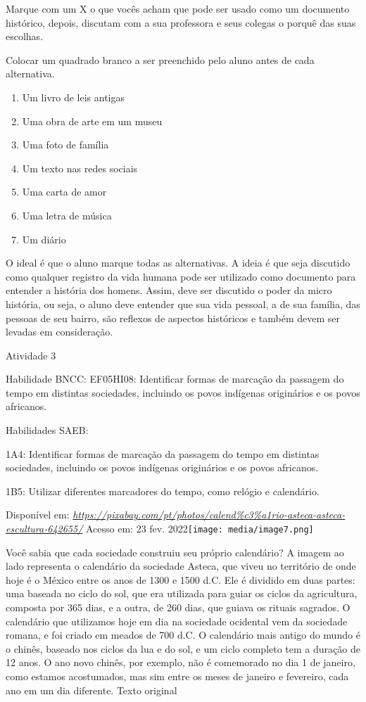 Marque com um X o que vocês acham que pode ser usado como um documento
histórico, depois, discutam com a sua professora e seus colegas o porquê
das suas escolhas.

Colocar um quadrado branco a ser preenchido pelo aluno antes de cada
alternativa.

\begin{enumerate}
\def\labelenumi{\arabic{enumi}.}
\item
  Um livro de leis antigas
\item
  Uma obra de arte em um museu
\item
  Uma foto de família
\item
  Um texto nas redes sociais
\item
  Uma carta de amor
\item
  Uma letra de música
\item
  Um diário
\end{enumerate}

O ideal é que o aluno marque todas as alternativas. A ideia é que seja
discutido como qualquer registro da vida humana pode ser utilizado como
documento para entender a história dos homens. Assim, deve ser discutido
o poder da micro história, ou seja, o aluno deve entender que sua vida
pessoal, a de sua família, das pessoas de seu bairro, são reflexos de
aspectos históricos e também devem ser levadas em consideração.

Atividade 3

Habilidade BNCC: EF05HI08: Identificar formas de marcação da passagem do
tempo em distintas sociedades, incluindo os povos indígenas originários
e os povos africanos.

Habilidades SAEB:

1A4: Identificar formas de marcação da passagem do tempo em distintas
sociedades, incluindo os povos indígenas originários e os povos
africanos.

1B5: Utilizar diferentes marcadores do tempo, como relógio e calendário.

Disponível em:
\href{https://pixabay.com/pt/photos/calend\%c3\%a1rio-asteca-asteca-escultura-642655/}{\emph{https://pixabay.com/pt/photos/calend\%c3\%a1rio-asteca-asteca-escultura-642655/}}
Acesso em: 23 fev.
2022\texttt{[image: media/image7.png]}

Você sabia que cada sociedade construiu seu próprio calendário? A imagem
ao lado representa o calendário da sociedade Asteca, que viveu no
território de onde hoje é o México entre os anos de 1300 e 1500 d.C. Ele
é dividido em duas partes: uma baseada no ciclo do sol, que era
utilizada para guiar os ciclos da agricultura, composta por 365 dias, e
a outra, de 260 dias, que guiava os rituais sagrados. O calendário que
utilizamos hoje em dia na sociedade ocidental vem da sociedade romana, e
foi criado em meados de 700 d.C. O calendário mais antigo do mundo é o
chinês, baseado nos ciclos da lua e do sol, e um ciclo completo tem a
duração de 12 anos. O ano novo chinês, por exemplo, não é comemorado no
dia 1 de janeiro, como estamos acostumados, mas sim entre os meses de
janeiro e fevereiro, cada ano em um dia diferente. Texto original

